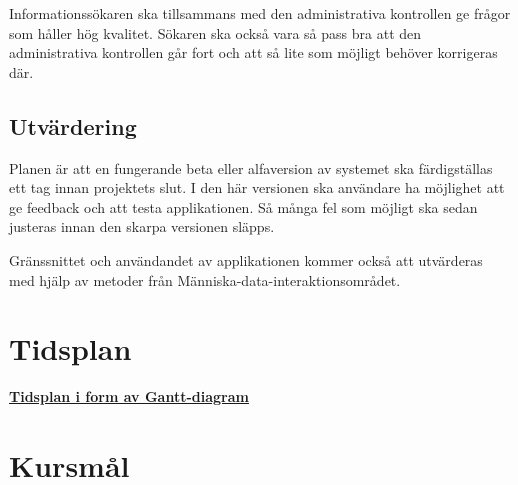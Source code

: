 \documentclass[12pt,a4paper]{article}
\begin{document}
Informationssökaren ska tillsammans med den administrativa kontrollen ge frågor som håller hög kvalitet. Sökaren ska också vara så pass bra att den administrativa kontrollen går fort och att så lite som möjligt behöver korrigeras där.
\subsection{Utvärdering}
Planen är att en fungerande beta eller alfaversion av systemet ska färdigställas ett tag innan projektets slut. I den här versionen ska användare ha möjlighet att ge feedback och att testa applikationen. Så många fel som möjligt ska sedan justeras innan den skarpa versionen släpps.

Gränssnittet och användandet av applikationen kommer också att utvärderas med hjälp av metoder från Människa-data-interaktionsområdet.
\appendix
\section{Tidsplan}

\textbf{\href{http://www.gantt-chart.com//?td=550c7506aa5a1dd480bd4c8d-845131}{Tidsplan i form av Gantt-diagram}}\\

\section{Kursmål}
\end{document}
